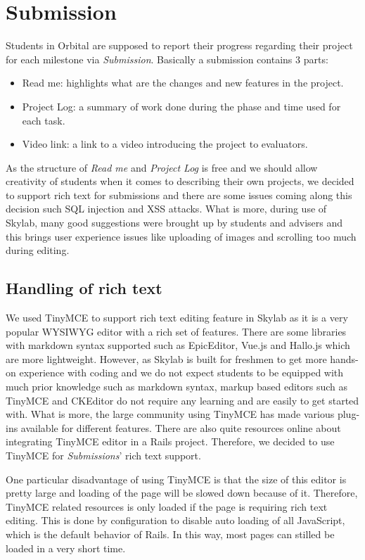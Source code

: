 \chapter{Submission}

Students in Orbital are supposed to report their progress regarding their project for each milestone via \textit{Submission}. Basically a submission contains 3 parts:

\begin{itemize}
  \item Read me: highlights what are the changes and new features in the project.
  \item Project Log: a summary of work done during the phase and time used for each task.
  \item Video link: a link to a video introducing the project to evaluators.
\end{itemize}

As the structure of \textit{Read me} and \textit{Project Log} is free and we should allow creativity of students when it comes to describing their own projects, we decided to support rich text for submissions and there are some issues coming along this decision such SQL injection and XSS attacks. What is more, during use of Skylab, many good suggestions were brought up by students and advisers and this brings user experience issues like uploading of images and scrolling too much during editing.

\section{Handling of rich text}
We used TinyMCE to support rich text editing feature in Skylab as it is a very popular WYSIWYG editor with a rich set of features\cite{citation10}. There are some libraries with markdown syntax supported such as EpicEditor, Vue.js and Hallo.js which are more lightweight. However, as Skylab is built for freshmen to get more hands-on experience with coding and we do not expect students to be equipped with much prior knowledge such as markdown syntax, markup based editors such as TinyMCE and CKEditor do not require any learning and are easily to get started with. What is more, the large community using TinyMCE has made various plug-ins available for different features. There are also quite resources online about integrating TinyMCE editor in a Rails project. Therefore, we decided to use TinyMCE for \textit{Submissions}' rich text support.

One particular disadvantage of using TinyMCE is that the size of this editor is pretty large and loading of the page will be slowed down because of it. Therefore, TinyMCE related resources is only loaded if the page is requiring rich text editing. This is done by configuration to disable auto loading of all JavaScript, which is the default behavior of Rails. In this way, most pages can stilled be loaded in a very short time.

